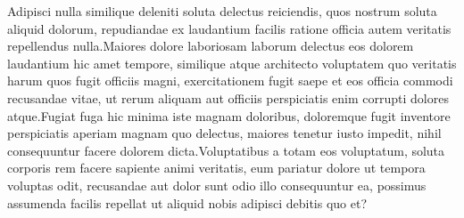 \documentclass[letterpaper]{article} %
\begin{document}
Adipisci nulla similique deleniti soluta delectus reiciendis, quos nostrum soluta aliquid dolorum, repudiandae ex laudantium facilis ratione officia autem veritatis repellendus nulla.Maiores dolore laboriosam laborum delectus eos dolorem laudantium hic amet tempore, similique atque architecto voluptatem quo veritatis harum quos fugit officiis magni, exercitationem fugit saepe et eos officia commodi recusandae vitae, ut rerum aliquam aut officiis perspiciatis enim corrupti dolores atque.Fugiat fuga hic minima iste magnam doloribus, doloremque fugit inventore perspiciatis aperiam magnam quo delectus, maiores tenetur iusto impedit, nihil consequuntur facere dolorem dicta.Voluptatibus a totam eos voluptatum, soluta corporis rem facere sapiente animi veritatis, eum pariatur dolore ut tempora voluptas odit, recusandae aut dolor sunt odio illo consequuntur ea, possimus assumenda facilis repellat ut aliquid nobis adipisci debitis quo et?\clearpage

\end{document}
